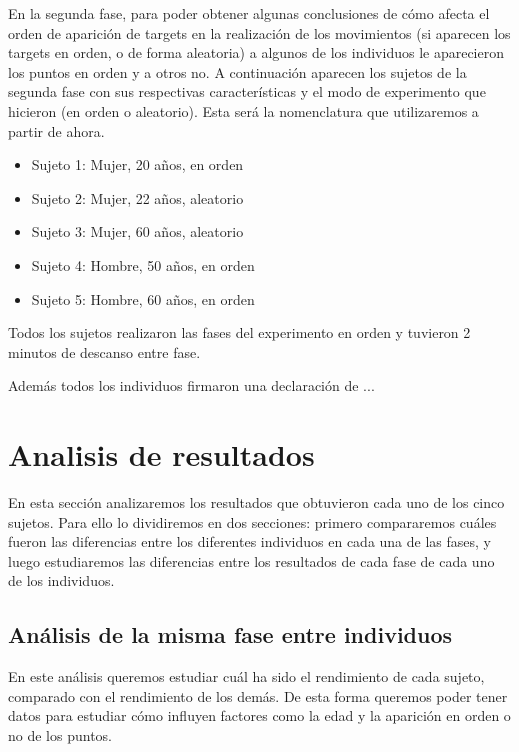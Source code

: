 \documentclass[a4paper,11pt, oneside]{book}
\begin{document}
En la segunda fase, para poder obtener algunas conclusiones de cómo afecta el orden de aparición de targets en la realización de los movimientos (si aparecen los targets en orden, o de forma aleatoria) a algunos de los individuos le aparecieron los puntos en orden y a otros no. A continuación aparecen los sujetos de la segunda fase con sus respectivas características y el modo de experimento que hicieron (en orden o aleatorio). Esta será la nomenclatura que utilizaremos a partir de ahora.

\begin{itemize}
	\item Sujeto 1: Mujer, 20 años, en orden
	\item Sujeto 2: Mujer, 22 años, aleatorio
	\item Sujeto 3: Mujer, 60 años, aleatorio
	\item Sujeto 4: Hombre, 50 años, en orden
	\item Sujeto 5: Hombre, 60 años, en orden
\end{itemize}

Todos los sujetos realizaron las fases del experimento en orden y tuvieron 2 minutos de descanso entre fase.


Además todos los individuos firmaron una declaración de ...

\section{Analisis de resultados}


En esta sección analizaremos los resultados que obtuvieron cada uno de los cinco sujetos. Para ello lo dividiremos en dos secciones: primero compararemos cuáles fueron las diferencias entre los diferentes individuos en cada una de las fases, y luego estudiaremos las diferencias entre los resultados de cada fase de cada uno de los individuos.


\subsection{Análisis de la misma fase entre individuos}

En este análisis queremos estudiar cuál ha sido el rendimiento de cada sujeto, comparado con el rendimiento de los demás. De esta forma queremos poder tener datos para estudiar cómo influyen factores como la edad y la aparición en orden o no de los puntos.
\end{document}
